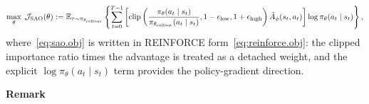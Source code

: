\begin{align}
     \label{eq:sao.obj}
     \max_{\theta}\;
     {\cal J}_{\text{SAO}}(\theta)
     :=
     \mathbb{E}_{\tau \sim \pi_{\theta_{\text{rollout}}}}
     \left\{
         \sum_{t=0}^{T-1}
         \left[
             \operatorname{clip}\left(
                 \frac{\pi_{\theta}(a_t \mid s_t)}
                      {\pi_{\theta_{\text{rollout}}}(a_t \mid s_t)},
                 1-\epsilon_{\text{low}},
                 1+\epsilon_{\text{high}}
             \right)
             \hat{A}_{\phi}(s_t,a_t)
         \right]
         \log\pi_{\theta}(a_t \mid s_t)
     \right\},
\end{align}
where~\eqref{eq:sao.obj} is written in REINFORCE form~\eqref{eq:reinforce.obj}: the clipped importance ratio times the advantage is treated as a detached weight, and the explicit $\log\pi_{\theta}(a_t \mid s_t)$ term provides the policy-gradient direction.

\textbf{Remark}

